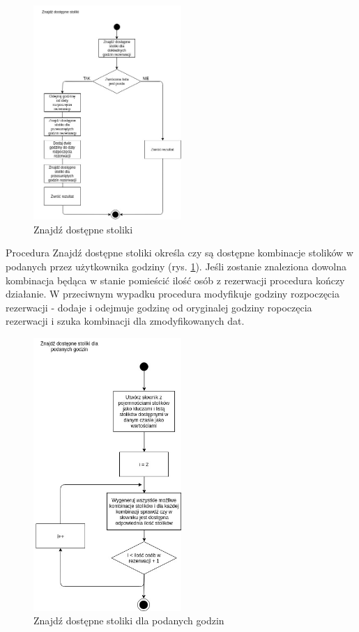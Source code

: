 \documentclass{article}
\begin{document}
\begin{figure}[h]
\centering
	\includegraphics[width=0.50\textwidth]{algo2.jpg}
	\caption[caption]{Znajdź dostępne stoliki}
	\label{fig:alg2}
\end{figure}

Procedura Znajdź dostępne stoliki określa czy są dostępne kombinacje stolików w podanych przez użytkownika godziny (rys. \ref{fig:alg2}). Jeśli zostanie znaleziona dowolna kombinacja będąca w stanie pomieścić ilość osób z rezerwacji procedura kończy działanie. W przeciwnym wypadku procedura modyfikuje godziny rozpoczęcia rezerwacji - dodaje i odejmuje godzinę od oryginalej godziny ropoczęcia rezerwacji i szuka kombinacji dla zmodyfikowanych dat.


\begin{figure}[h]
\centering
	\includegraphics[width=0.50\textwidth]{algo3.jpg}
	\caption[caption]{Znajdź dostępne stoliki dla podanych godzin}
	\label{fig:alg3}
\end{figure}
\end{document}

